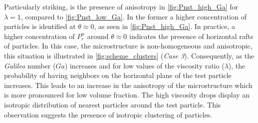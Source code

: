 Particularly striking, is the presence of anisotropy in \ref{fig:Pnst_high_Ga} for $\lambda=1$, compared to \ref{fig:Pnst_low_Ga}. In the former a higher concentration of particles is identified at $\theta \approx 0$, as seen in \ref{fig:Pnst_high_Ga}. In practice, a higher concentration of $P_r^n$ around $\theta \approx 0$ indicates the presence of horizontal rafts of particles. 
In this case, the microstructure is non-homogeneous and anisotropic, this situation is illustrated in \ref{fig:scheme_clusters} (\textit{Case 3}).  
Consequently, as the \textit{Galileo} number ($Ga$) increases and for low values of the viscosity ratio ($\lambda$), the probability of having neighbors on the horizontal plane of the test particle increases. 
This leads to an increase in the anisotropy of the microstructure which is more pronounced for low volume fraction. The high viscosity drops display an isotropic distribution of nearest particles around the test particle. This observation suggests the presence of isotropic clustering of particles.





